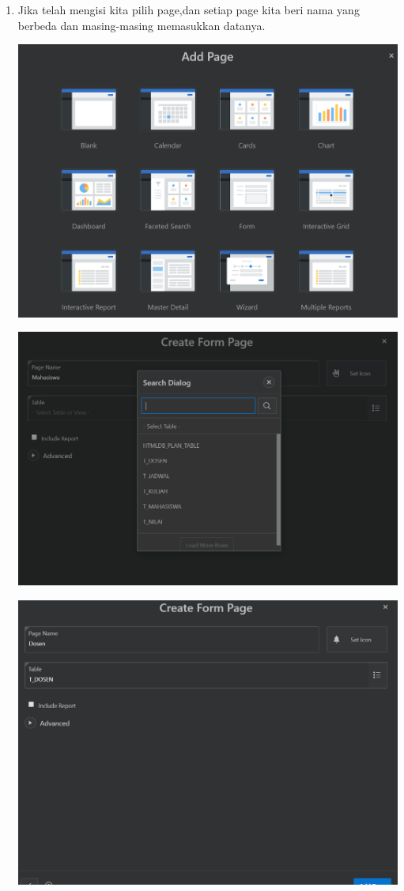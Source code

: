 \documentclass{article}
\begin{document}
\begin{enumerate}
\begin{center}
\end{center}
    \item Jika telah mengisi kita pilih page,dan setiap page kita beri nama yang berbeda dan masing-masing memasukkan datanya.
    \begin{center}
    \includegraphics[width=.8\textwidth]{figure/27.PNG}
\end{center}
\begin{center}
    \includegraphics[width=.8\textwidth]{figure/28.PNG}
\end{center}
\begin{center}
    \includegraphics[width=.8\textwidth]{figure/29.PNG}

\end{center}
\end{enumerate}
\end{document}
